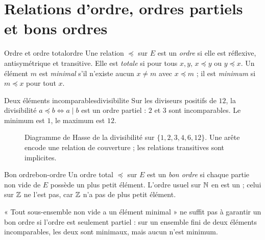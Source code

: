 \section{Relations d'ordre, ordres partiels et bons ordres}
\begin{definition}{Ordre et ordre total}{ordre}
Une relation $\preceq$ sur $E$ est un \emph{ordre} si elle est réflexive, antisymétrique et transitive. Elle est \emph{totale} si pour tous $x,y$, $x\preceq y$ ou $y\preceq x$. Un élément $m$ est \emph{minimal} s'il n'existe aucun $x\ne m$ avec $x\preceq m$ ; il est \emph{minimum} si $m\preceq x$ pour tout $x$.
\end{definition}
\begin{exemple}{Deux éléments incomparables}{divisibilite}
Sur les diviseurs positifs de $12$, la divisibilité $a\preceq b\iff a\mid b$ est un ordre partiel : $2$ et $3$ sont incomparables. Le minimum est $1$, le maximum est $12$.
\end{exemple}
\begin{figure}[htbp]\centering
{}
\caption{Diagramme de Hasse de la divisibilité sur $\{1,2,3,4,6,12\}$. Une arête encode une relation de couverture ; les relations transitives sont implicites.}
\end{figure}
\begin{definition}{Bon ordre}{bon-ordre}
Un ordre total $\preceq$ sur $E$ est un \emph{bon ordre} si chaque partie non vide de $E$ possède un plus petit élément. L'ordre usuel sur $\mathbb N$ en est un ; celui sur $\mathbb Z$ ne l'est pas, car $\mathbb Z$ n'a pas de plus petit élément.
\end{definition}
\begin{attention}
« Tout sous-ensemble non vide a un élément minimal » ne suffit pas à garantir un bon ordre si l'ordre est seulement partiel : sur un ensemble fini de deux éléments incomparables, les deux sont minimaux, mais aucun n'est minimum.
\end{attention}

